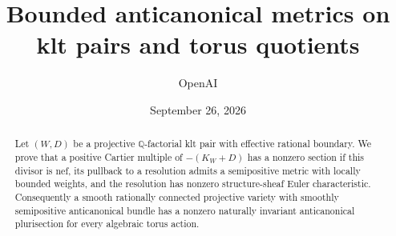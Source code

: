 \documentclass[11pt]{amsart}
\title[Bounded anticanonical metrics and equivariant nonvanishing]{Bounded anticanonical metrics on klt pairs and torus quotients}
\author{OpenAI}
\date{September 26, 2026}
\theoremstyle{definition}
\theoremstyle{remark}
\newcommand{\QQ}{\mathbb Q}
\begin{document}
\begin{abstract}
Let $(W,D)$ be a projective $\QQ$-factorial klt pair with effective rational boundary. We prove that a positive Cartier multiple of $-(K_W+D)$ has a nonzero section if this divisor is nef, its pullback to a resolution admits a semipositive metric with locally bounded weights, and the resolution has nonzero structure-sheaf Euler characteristic. Consequently a smooth rationally connected projective variety with smoothly semipositive anticanonical bundle has a nonzero naturally invariant anticanonical plurisection for every algebraic torus action.
\end{abstract}
\maketitle
\tableofcontents






\end{document}

